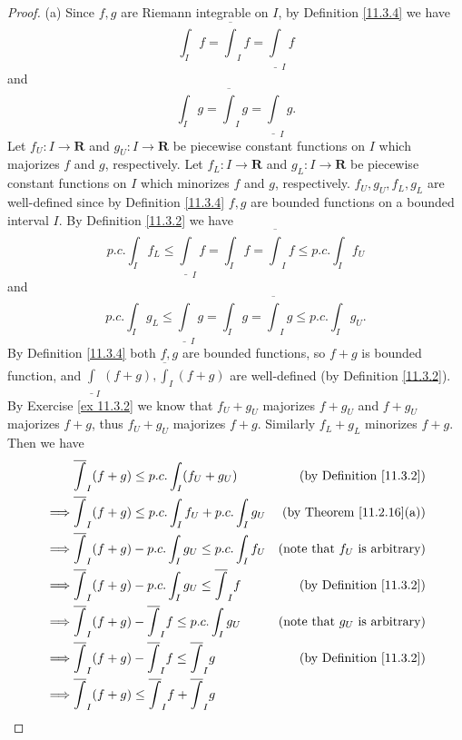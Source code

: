 \begin{proof}{(a)}
    Since \(f, g\) are Riemann integrable on \(I\), by Definition \ref{11.3.4} we have
    \[
        \int_I f = \overline{\int}_I f = \underline{\int}_I f
    \]
    and
    \[
        \int_I g = \overline{\int}_I g = \underline{\int}_I g.
    \]
    Let \(f_U : I \to \mathbf{R}\) and \(g_U : I \to \mathbf{R}\) be piecewise constant functions on \(I\) which majorizes \(f\) and \(g\), respectively.
    Let \(f_L : I \to \mathbf{R}\) and \(g_L : I \to \mathbf{R}\) be piecewise constant functions on \(I\) which minorizes \(f\) and \(g\), respectively.
    \(f_U, g_U, f_L, g_L\) are well-defined since by Definition \ref{11.3.4} \(f, g\) are bounded functions on a bounded interval \(I\).
    By Definition \ref{11.3.2} we have
    \[
        p.c. \int_I f_L \leq \underline{\int}_I f = \int_I f = \overline{\int}_I f \leq p.c. \int_I f_U
    \]
    and
    \[
        p.c. \int_I g_L \leq \underline{\int}_I g = \int_I g = \overline{\int}_I g \leq p.c. \int_I g_U.
    \]
    By Definition \ref{11.3.4} both \(f, g\) are bounded functions, so \(f + g\) is bounded function, and \(\underline{\int}_I (f + g), \overline{\int}_I (f + g)\) are well-defined (by Definition \ref{11.3.2}).
    By Exercise \ref{ex 11.3.2} we know that \(f_U + g_U\) majorizes \(f + g_U\) and \(f + g_U\) majorizes \(f + g\), thus \(f_U + g_U\) majorizes \(f + g\).
    Similarly \(f_L + g_L\) minorizes \(f + g\).
    Then we have
    \begin{align*}
                 & \overline{\int}_I (f + g) \leq p.c. \int_I (f_U + g_U)                   & \text{(by Definition \ref{11.3.2})}     \\
        \implies & \overline{\int}_I (f + g) \leq p.c. \int_I f_U + p.c. \int_I g_U         & \text{(by Theorem \ref{11.2.16}(a))}    \\
        \implies & \overline{\int}_I (f + g) - p.c. \int_I g_U \leq p.c. \int_I f_U         & \text{(note that \(f_U\) is arbitrary)} \\
        \implies & \overline{\int}_I (f + g) - p.c. \int_I g_U \leq \overline{\int}_I f     & \text{(by Definition \ref{11.3.2})}     \\
        \implies & \overline{\int}_I (f + g) - \overline{\int}_I f \leq p.c. \int_I g_U     & \text{(note that \(g_U\) is arbitrary)} \\
        \implies & \overline{\int}_I (f + g) - \overline{\int}_I f \leq \overline{\int}_I g & \text{(by Definition \ref{11.3.2})}     \\
        \implies & \overline{\int}_I (f + g) \leq \overline{\int}_I f + \overline{\int}_I g &                                         \\

\end{align*}
\end{proof}
